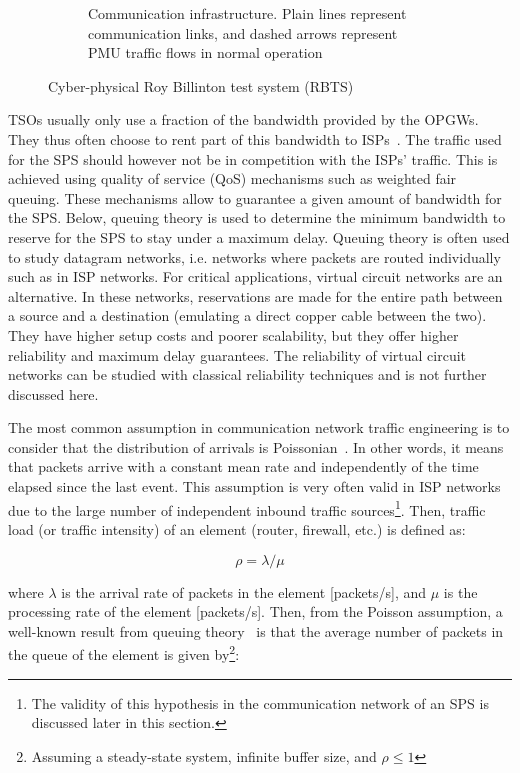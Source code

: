 \begin{figure}
\begin{subfigure}[b]{0.45\textwidth}
         \caption{Communication infrastructure. Plain lines represent communication links, and dashed arrows represent PMU traffic flows in normal operation}
         \label{fig:RBTS-cyber}
     \end{subfigure}
\caption{Cyber-physical Roy Billinton test system (RBTS)}
\label{fig:RBTS}
\end{figure}

TSOs usually only use a fraction of the bandwidth provided by the OPGWs. They thus often choose to rent part of this bandwidth to ISPs~\cite[p110]{bookUK_OPGW}. The traffic used for the SPS should however not be in competition with the ISPs' traffic. This is achieved using quality of service (QoS) mechanisms such as weighted fair queuing. These mechanisms allow to guarantee a given amount of bandwidth for the SPS. Below, queuing theory is used to determine the minimum bandwidth to reserve for the SPS to stay under a maximum delay. Queuing theory is often used to study datagram networks, i.e. networks where packets are routed individually such as in ISP networks. For critical applications, virtual circuit networks are an alternative. In these networks, reservations are made for the entire path between a source and a destination (emulating a direct copper cable between the two). They have higher setup costs and poorer scalability, but they offer higher reliability and maximum delay guarantees. The reliability of virtual circuit networks can be studied with classical reliability techniques and is not further discussed here.

The most common assumption in communication network traffic engineering is to consider that the distribution of arrivals is Poissonian~\cite{trafficBook}. In other words, it means that packets arrive with a constant mean rate and independently of the time elapsed since the last event. This assumption is very often valid in ISP networks due to the large number of independent inbound traffic sources\footnote{The validity of this hypothesis in the communication network of an SPS is discussed later in this section.}. Then, traffic load (or traffic intensity) of an element (router, firewall, etc.) is defined as:

\begin{equation}
\rho = \lambda/\mu
\end{equation}

\noindent where \(\lambda\) is the arrival rate of packets in the element [packets/s], and \(\mu\) is the processing rate of the element [packets/s]. Then, from the Poisson assumption, a well-known result from queuing theory~\cite{trafficBook} is that the average number of packets in the queue of the element is given by\footnote{Assuming a steady-state system, infinite buffer size, and \(\rho \leq 1\)}:

